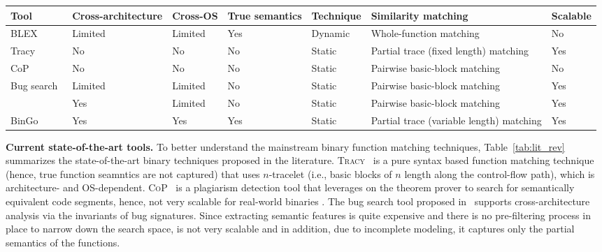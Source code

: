 \begin{table*}[t]
\scriptsize
	\begin{center}
\caption{Comparison of existing techniques} \label{tab:lit_rev}
\begin{tabular}{ | m{2.1cm} | m{2cm} | m{1.3cm} | m{2.5cm} | m{1.2cm} | m{4cm} | m{1.0cm}| }
\hline
	\textbf{Tool} & \textbf{Cross-architecture} & \textbf{Cross-OS} & \textbf{True semantics} & \textbf{Technique} & \textbf{Similarity matching} & \textbf{Scalable} \\ \hline
	 BLEX~\cite{egele2014blanket} & Limited & Limited & Yes & Dynamic & Whole-function matching & No \\ \hline
	 Tracy~\cite{DBLP:conf/pldi/DavidY14} & No & No & No & Static & Partial trace (fixed length) matching & Yes \\ \hline
     CoP~\cite{luo2014semantics} & No & No & No & Static & Pairwise basic-block matching& No \\ \hline
	Bug search~\cite{DBLP:conf/sp/PewnyGGRH15} & Limited & Limited & No & Static & Pairwise basic-block matching & Yes \\ \hline
	\mahin{discovRE}~\cite{DBLP:conf/sp/PewnyGGRH15} & Yes & Limited & No & Static & Pairwise basic-block matching & Yes \\ \hline
	 BinGo & Yes & Yes & Yes & Static & Partial trace (variable length) matching & Yes \\ \hline
\end{tabular}
\end{center} \vspace{-5mm}
\end{table*}

\noindent\textbf{Current state-of-the-art tools.} To better understand the mainstream binary function matching techniques, Table~\ref{tab:lit_rev} summarizes the state-of-the-art binary techniques proposed in the literature. \textsc{\small Tracy}~\cite{DBLP:conf/pldi/DavidY14} is a pure syntax based function matching technique (hence, true function seamntics are not captured) that uses $n$-tracelet (i.e., basic blocks of $n$ length along the control-flow path), which is architecture- and OS-dependent. \textsc{\small CoP}~\cite{luo2014semantics} is a plagiarism detection tool that leverages on the theorem prover to search for semantically equivalent code segments, hence, not very scalable for real-world binaries .  The bug search tool proposed in~\cite{DBLP:conf/sp/PewnyGGRH15} supports cross-architecture analysis via the invariants of bug signatures.
Since extracting semantic features is quite expensive and there is no pre-filtering process in place to narrow down the search space,  \cite{DBLP:conf/sp/PewnyGGRH15} is not very scalable and in addition, due to incomplete modeling, it captures only the partial semantics of the functions.

